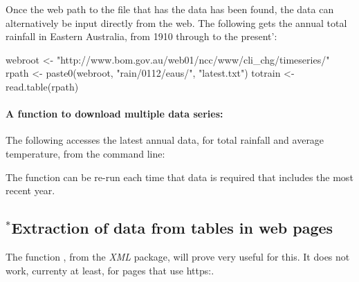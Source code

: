 Once the web path to the file that has the data has been found,
the data can alternatively be input directly from the web.
The following gets the annual total rainfall in Eastern Australia,
from 1910 through to the present':
\begin{fullwidth}
\begin{Schunk}
\begin{Sinput}
webroot <- "http://www.bom.gov.au/web01/ncc/www/cli_chg/timeseries/"
rpath <- paste0(webroot, "rain/0112/eaus/", "latest.txt")
totrain <- read.table(rpath)
\end{Sinput}
\end{Schunk}
\end{fullwidth}

\paragraph{A function to download multiple data series:}
The following accesses the latest annual data, for total rainfall
and average temperature, from the command line:
\begin{fullwidth}
\begin{Schunk}
\end{Schunk}
\end{fullwidth}
\noindent
The function can be re-run each time that data is required that
includes the most recent year.

\subsection*{$^*$Extraction of data from tables in web pages}

The function , from the {\em XML} package,
will prove very useful for this.  It does not work, currenty at
least, for pages that use https:.

